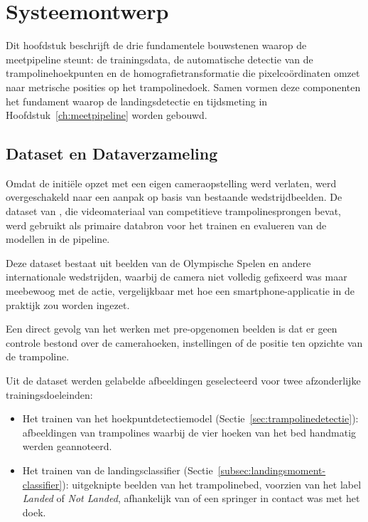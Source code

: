 
\chapter{Systeemontwerp}
\label{ch:systeemontwerp}

Dit hoofdstuk beschrijft de drie fundamentele bouwstenen waarop de meetpipeline steunt: de trainingsdata, de automatische detectie van de trampolinehoekpunten en de homografietransformatie die pixelco{\"o}rdinaten omzet naar metrische posities op het trampolinedoek. Samen vormen deze componenten het fundament waarop de landingsdetectie en tijdsmeting in Hoofdstuk~\ref{ch:meetpipeline} worden gebouwd.


\section{Dataset en Dataverzameling}
\label{sec:dataset}

Omdat de initi{\"e}le opzet met een eigen cameraopstelling werd verlaten, werd overgeschakeld naar een aanpak op basis van bestaande wedstrijdbeelden. De dataset van \textcite{Lin2025}, die videomateriaal van competitieve trampolinesprongen bevat, werd gebruikt als primaire databron voor het trainen en evalueren van de modellen in de pipeline.

Deze dataset bestaat uit beelden van de Olympische Spelen en andere internationale wedstrijden, waarbij de camera niet volledig gefixeerd was maar meebewoog met de actie, vergelijkbaar met hoe een smartphone-applicatie in de praktijk zou worden ingezet.

Een direct gevolg van het werken met pre-opgenomen beelden is dat er geen controle bestond over de camerahoeken, instellingen of de positie ten opzichte van de trampoline.

Uit de dataset werden gelabelde afbeeldingen geselecteerd voor twee afzonderlijke trainingsdoeleinden:
\begin{itemize}
    \item Het trainen van het hoekpuntdetectiemodel (Sectie~\ref{sec:trampolinedetectie}): afbeeldingen van trampolines waarbij de vier hoeken van het bed handmatig werden geannoteerd.
    \item Het trainen van de landingsclassifier (Sectie~\ref{subsec:landingsmoment-classifier}): uitgeknipte beelden van het trampolinebed, voorzien van het label \textit{Landed} of \textit{Not Landed}, afhankelijk van of een springer in contact was met het doek.
\end{itemize}

